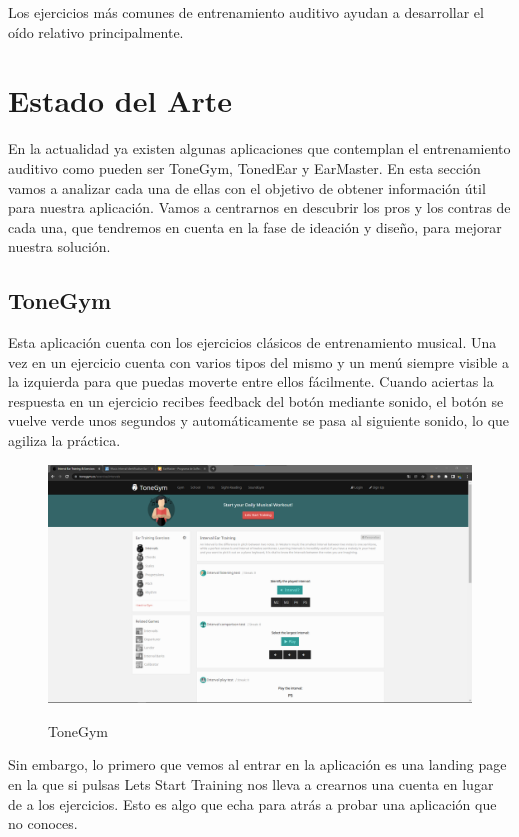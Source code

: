 \documentclass[12pt,twoside,titlepage]{report}
\begin{document}
Los ejercicios más comunes de entrenamiento auditivo ayudan a desarrollar el oído relativo principalmente.

\section{Estado del Arte}

En la actualidad ya existen algunas aplicaciones que contemplan el entrenamiento auditivo como pueden ser ToneGym, TonedEar y EarMaster. En esta sección vamos a analizar cada una de ellas con el objetivo de obtener información útil para nuestra aplicación. Vamos a centrarnos en descubrir los pros y los contras de cada una, que tendremos en cuenta en la fase de ideación y diseño, para mejorar nuestra solución.

\subsection{ToneGym}

Esta aplicación cuenta con los ejercicios clásicos de entrenamiento musical. Una vez en un ejercicio cuenta con varios tipos del mismo y un menú siempre visible a la izquierda para que puedas moverte entre ellos fácilmente. Cuando aciertas la respuesta en un ejercicio recibes feedback del botón mediante sonido, el botón se vuelve verde unos segundos y automáticamente se pasa al siguiente sonido, lo que agiliza la práctica.

\begin{figure}[H] 
    \includegraphics[scale=0.25]{Estado del Arte/tonegym}
    \centering
    \label{fig:tonegym}
    \caption{ToneGym}
\end{figure}

Sin embargo, lo primero que vemos al entrar en la aplicación es una landing page en la que si pulsas Lets Start Training nos lleva a crearnos una cuenta en lugar de a los ejercicios. Esto es algo que echa para atrás a probar una aplicación que no conoces. 
\end{document}
